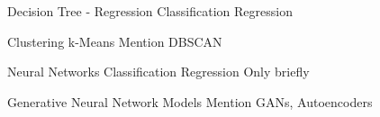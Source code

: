   \begin{frame}{Decision Tree - Regression}
  Classification
  Regression
  \end{frame}

  \begin{frame}{Clustering}
  k-Means
  Mention DBSCAN
  \end{frame}

  \begin{frame}{Neural Networks}
  Classification
  Regression
  Only briefly
  \end{frame}

  \begin{frame}{Generative Neural Network Models}
  Mention GANs, Autoencoders
  \end{frame}




